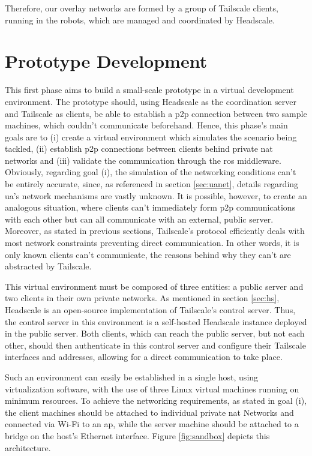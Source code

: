 \documentclass[11pt,twoside,a4paper]{report}
\begin{document}
Therefore, our overlay networks are formed by a group of Tailscale clients, running in the robots, which are managed and coordinated by Headscale.

\section{Prototype Development}
\label{sec:protodev}

This first phase aims to build a small-scale prototype in a virtual development environment. The prototype should, using Headscale as the coordination server and Tailscale as clients, be able to establish a \ac{p2p} connection between two sample machines, which couldn't communicate beforehand. Hence, this phase's main goals are to (i) create a virtual environment which simulates the scenario being tackled, (ii) establish \ac{p2p} connections between clients behind private \ac{nat} networks  and (iii) validate the communication through the \ac{ros} middleware. Obviously, regarding goal (i), the simulation of the networking conditions can't be entirely accurate, since, as referenced in section \ref{sec:uanet}, details regarding \ac{ua}'s network mechanisms are vastly unknown. It is possible, however, to create an analogous situation, where clients can't immediately form \ac{p2p} communications with each other but can all communicate with an external, public server. Moreover, as stated in previous sections, Tailscale's protocol efficiently deals with most network constraints preventing direct communication. In other words, it is only known clients can't communicate, the reasons behind why they can't are abstracted by Tailscale.

This virtual environment must be composed of three entities: a public server and two clients in their own private networks. As mentioned in section \ref{sec:hs}, Headscale is an open-source implementation of Tailscale's control server. Thus, the control server in this environment is a self-hosted Headscale instance deployed in the public server. Both clients, which can reach the public server, but not each other, should then authenticate in this control server and configure their Tailscale interfaces and addresses, allowing for a direct communication to take place.

Such an environment can easily be established in a single host, using virtualization software, with the use of three Linux virtual machines running on minimum resources. To achieve the networking requirements, as stated in goal (i), the client machines should be attached to individual private \ac{nat} Networks and connected via Wi-Fi to an \ac{ap}, while the server machine should be attached to a bridge on the host's Ethernet interface. Figure \ref{fig:sandbox} depicts this architecture.
\end{document}
